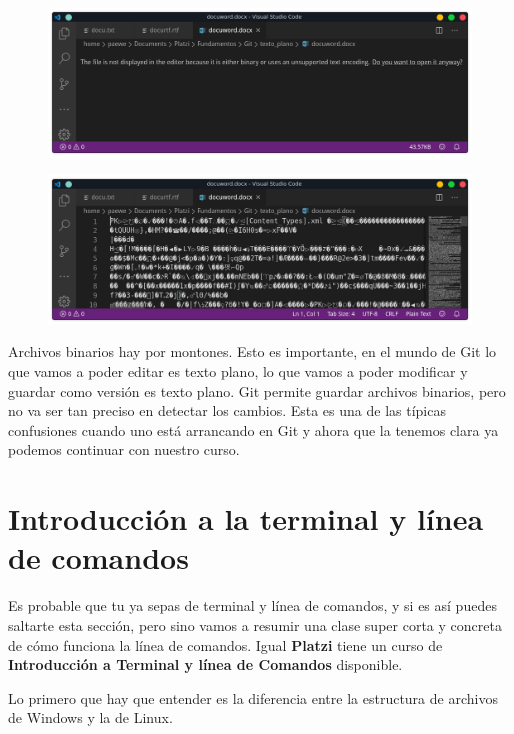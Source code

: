 \documentclass{article}
\begin{document}
\begin{figure}[h!]
  \centering
  \includegraphics[scale=0.5]{./Pictures/052_texto_binario.png}
\end{figure}

\begin{figure}[h!]
  \centering
  \includegraphics[scale=0.5]{./Pictures/053_texto_binario.png}
\end{figure}

Archivos binarios hay por montones. Esto es importante, en el mundo de Git lo
que vamos a poder editar es texto plano, lo que vamos a poder modificar y
guardar como versión es texto plano. Git permite guardar archivos binarios,
pero no va ser tan preciso en detectar los cambios. Esta es una de las típicas
confusiones cuando uno está arrancando en Git y ahora que la tenemos clara ya
podemos continuar con nuestro curso.

\newpage


\section{Introducción a la terminal y línea de comandos}%
Es probable que tu ya sepas de terminal y línea de comandos, y si es así puedes
saltarte esta sección, pero sino vamos a resumir una clase super corta y
concreta de cómo funciona la línea de comandos. Igual \textbf{Platzi} tiene un
curso de \textbf{Introducción a Terminal y línea de Comandos} disponible.

Lo primero que hay que entender es la diferencia entre la estructura de
archivos de Windows y la de Linux.
\end{document}
